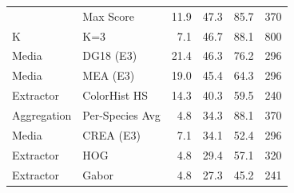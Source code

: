 \begin{table}[ht]
\begin{tabularx}{\textwidth}{@{}l X r r r r@{}}
{Aggregation & Max Score & 11.9 & 47.3 & 85.7 & 370 \\
K & K=3 & 7.1 & 46.7 & 88.1 & 800 \\
Media & DG18 (E3) & 21.4 & 46.3 & 76.2 & 296 \\
Media & MEA (E3) & 19.0 & 45.4 & 64.3 & 296 \\
Extractor & ColorHist HS & 14.3 & 40.3 & 59.5 & 240 \\
Aggregation & Per-Species Avg & 4.8 & 34.3 & 88.1 & 370 \\
Media & CREA (E3) & 7.1 & 34.1 & 52.4 & 296 \\
Extractor & HOG & 4.8 & 29.4 & 57.1 & 320 \\
Extractor & Gabor & 4.8 & 27.3 & 45.2 & 241 \\
\bottomrule
\end{tabularx}
\end{table}
